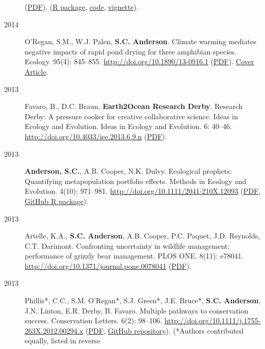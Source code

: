 \begin{description}
(\href{http://www.plosone.org/article/fetchObject.action?uri=info\%3Adoi\%2F10.1371\%2Fjournal.pone.0092725\&representation=PDF}{PDF}).
(\href{http://cran.r-project.org/web/packages/ss3sim/index.html}{R
package}, \href{https://github.com/ss3sim/ss3sim}{code},
\href{https://dl.dropboxusercontent.com/u/254940/ss3sim-vignette.pdf}{vignette}).
\item[2014]
O'Regan, S.M., W.J. Palen, \textbf{S.C. Anderson}. Climate warming
mediates negative impacts of rapid pond drying for three amphibian
species. Ecology. 95(4): 845--855.
\url{http://doi.org/10.1890/13-0916.1}
(\href{http://www.esajournals.org/doi/pdf/10.1890/13-0916.1}{PDF}).
\href{http://www.esajournals.org/userimages/ContentEditor/1398099670397/i0012-9658-95-4-cov.pdf}{Cover
Article}.
\item[2013]
Favaro, B., D.C. Braun, \textbf{Earth2Ocean Research Derby}. Research
Derby: A pressure cooker for creative collaborative science. Ideas in
Ecology and Evolution. Ideas in Ecology and Evolution. 6: 40--46.
\url{http://doi.org/10.4033/iee.2013.6.9.n}
(\href{http://library.queensu.ca/ojs/index.php/IEE/article/download/4931/4899}{PDF}).
\item[2013]
\textbf{Anderson, S.C.}, A.B. Cooper, N.K. Dulvy. Ecological prophets:
Quantifying metapopulation portfolio effects. Methods in Ecology and
Evolution. 4(10): 971--981. \url{http://doi.org/10.1111/2041-210X.12093}
(\href{https://dl.dropboxusercontent.com/u/254940/papers/Anderson_etal_2013_ecological_prophets_with_SOM.pdf}{PDF},
\href{https://github.com/seananderson/ecofolio}{GitHub R package}).
\item[2013]
Artelle, K.A., \textbf{S.C. Anderson}, A.B. Cooper, P.C. Paquet, J.D.
Reynolds, C.T. Darimont. Confronting uncertainty in wildlife management:
performance of grizzly bear management. PLOS ONE. 8(11): e78041.
\url{http://doi.org/10.1371/journal.pone.0078041}
(\href{http://www.plosone.org/article/fetchObject.action?uri=info\%3Adoi\%2F10.1371\%2Fjournal.pone.0078041\&representation=PDF}{PDF}).
\item[2013]
Phillis*, C.C., S.M. O'Regan*, S.J. Green*, J.E. Bruce*, \textbf{S.C.
Anderson}, J.N. Linton, E.R. Derby, B. Favaro. Multiple pathways to
conservation success. Conservation Letters. 6(2): 98--106.
\url{http://doi.org/10.1111/j.1755-263X.2012.00294.x}
(\href{https://dl.dropboxusercontent.com/u/254940/papers/Phillis_etal_2012_Multiple_pathways_to_conservation_success.pdf}{PDF},
\href{https://github.com/seananderson/conservation_pathways}{GitHub
repository}). (*Authors contributed equally, listed in reverse

\end{description}
